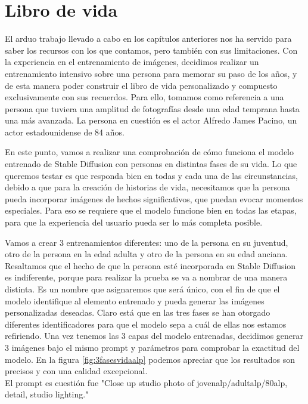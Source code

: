 \chapter{Libro de vida}
\label{cap:librodevida}

El arduo trabajo llevado a cabo en los capítulos anteriores nos ha servido para saber los recursos con los que contamos, pero también con sus limitaciones. Con la experiencia en el entrenamiento de imágenes, decidimos realizar un entrenamiento intensivo sobre una persona para memorar su paso de los años, y de esta manera poder construir el libro de vida personalizado y compuesto exclusivamente con sus recuerdos. Para ello, tomamos como referencia a una persona que tuviera una amplitud de fotografías desde una edad temprana hasta una más avanzada. La persona en cuestión es el actor Alfredo James Pacino, un actor estadounidense de 84 años.


En este punto, vamos a realizar una comprobación de cómo funciona el modelo entrenado de Stable Diffusion con personas en distintas fases de su vida. Lo que queremos testar es que responda bien en todas y cada una de las circunstancias, debido a que para la creación de historias de vida, necesitamos que la persona pueda incorporar imágenes de hechos significativos, que puedan evocar momentos especiales. Para eso se requiere que el modelo funcione bien en todas las etapas, para que la experiencia del usuario pueda ser lo más completa posible.

Vamos a crear 3 entrenamientos diferentes: uno de la persona en su juventud, otro de la persona en la edad adulta y otro de la persona en su edad anciana. Resaltamos que el hecho de que la persona esté incorporada en Stable Diffusion es indiferente, porque para realizar la prueba se va a nombrar de una manera distinta. Es un nombre que asignaremos que será único, con el fin de que el modelo identifique al elemento entrenado y pueda generar las imágenes personalizadas deseadas. Claro está que en las tres fases se han otorgado diferentes identificadores para que el modelo sepa a cuál de ellas nos estamos refiriendo. Una vez tenemos las 3 capas del modelo entrenadas, decidimos generar 3 imágenes bajo el mismo prompt y parámetros para comprobar la exactitud del modelo. En la figura \ref{fig:3fasesvidaalp} podemos apreciar que los resultados son precisos y con una calidad excepcional.\\
 
El prompt es cuestión fue "Close up studio photo of jovenalp/adultalp/80alp, detail, studio lighting."

